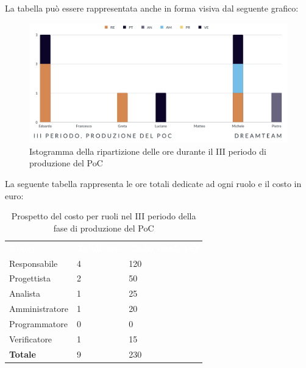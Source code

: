 La tabella può essere rappresentata anche in forma visiva dal seguente grafico:
\begin{figure}[!h]
\centering
\includegraphics[scale=0.65]{Sezioni/SezioniPreventivo/grafici/Poc_III_periodo.png}
\caption{Istogramma della ripartizione delle ore durante il III periodo di produzione del PoC}
\end{figure}

La seguente tabella rappresenta le ore totali dedicate ad ogni ruolo e il costo in euro:

\begin{table}[!htbp]
\begin{center}
\renewcommand{\arraystretch}{1.5}
\begin{tabular}{ m{}<{\centering}  m{}<{\centering} m{}<{\centering}}
	\rowcolor{darkblue}
	\textcolor{white}{\textbf{Ruolo}}&\textcolor{white}{\textbf{Totale ore}}&\textcolor{white}{\textbf{Costo totale (\euro)}}\\ 

	Responsabile  & 4 & 120\\	
	
	Progettista & 2 & 50\\
	
	Analista & 1 & 25 \\

	Amministratore & 1 & 20 \\
	
	Programmatore & 0 & 0 \\
	
	Verificatore & 1 & 15 \\
	
	\textbf{Totale} & 9 & 230 \\
	
\end{tabular}
\caption{Prospetto del costo per ruoli nel III periodo della fase di produzione del PoC}
\end{center}
\end{table}

